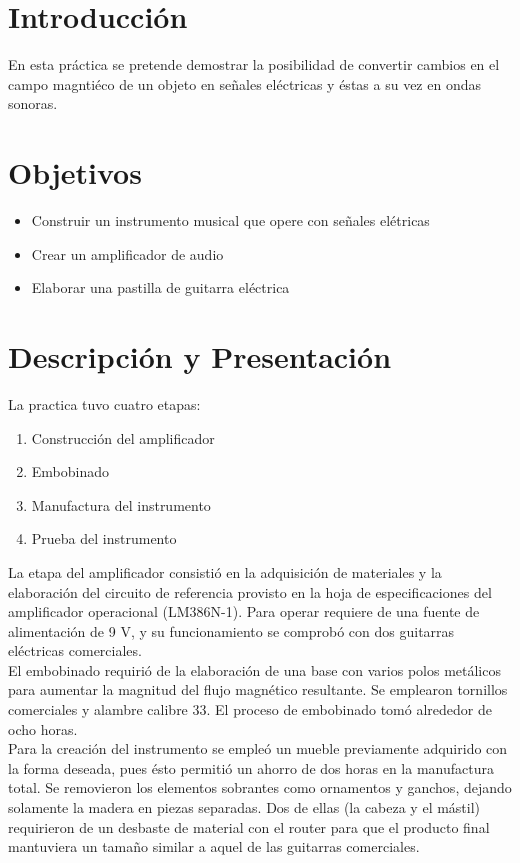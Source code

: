 \section{Introducci\'on}
En esta pr\'actica se pretende demostrar la posibilidad de convertir cambios en el campo magnti\'eco de un objeto en se\~nales el\'ectricas y 
\'estas a su vez en ondas sonoras.
\section{Objetivos}
\begin{itemize}
 \item Construir un instrumento musical que opere con se\~nales el\'etricas
 \item Crear un amplificador de audio
 \item Elaborar una pastilla de guitarra el\'ectrica
\end{itemize}

\section{Descripci\'on y Presentaci\'on}
La practica tuvo cuatro etapas:
\begin{enumerate}
 \item Construcci\'on del amplificador
 \item Embobinado
 \item Manufactura del instrumento
 \item Prueba del instrumento
\end{enumerate}

La etapa del amplificador consisti\'o en la adquisici\'on de materiales y la elaboraci\'on del circuito de referencia provisto en la hoja de 
especificaciones del amplificador operacional (LM386N-1). Para operar requiere de una fuente de alimentaci\'on de 9 V, y su funcionamiento se 
comprob\'o con dos guitarras el\'ectricas comerciales.\\

El embobinado requiri\'o de la elaboraci\'on de una base con varios polos met\'alicos para aumentar la magnitud del flujo magn\'etico resultante. 
Se emplearon tornillos comerciales y alambre calibre 33. El proceso de embobinado tom\'o alrededor de ocho horas.\\

Para la creaci\'on del instrumento se emple\'o un mueble previamente adquirido con la forma deseada, pues \'esto permiti\'o un ahorro de dos horas 
en la manufactura total. Se removieron los elementos sobrantes como ornamentos y ganchos, dejando solamente la madera en piezas separadas. Dos de 
ellas (la cabeza y el m\'astil) requirieron de un desbaste de material con el router para que el producto final mantuviera un tama\~no similar a 
aquel de las guitarras comerciales. \\

